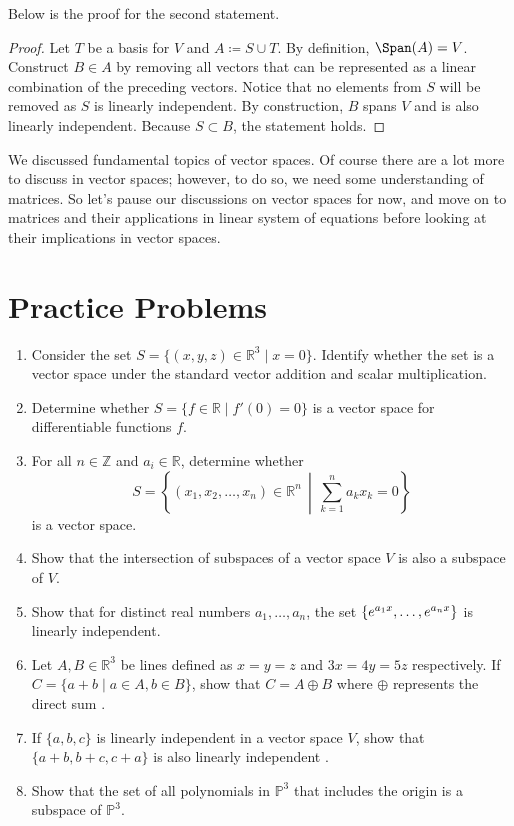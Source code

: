 \documentclass[../main.tex]{subfiles}
\begin{document}
Below is the proof for the second statement.

\begin{proof}
Let $T$ be a basis for $V$ and $A \coloneqq S \cup T$. By definition,
$\Span(A) = V$. Construct $B \in A$ by removing all vectors that can
be represented as a linear combination of the preceding vectors.
Notice that no elements from $S$ will be removed as $S$ is linearly
independent. By construction, $B$ spans $V$ and is also linearly
independent. Because $S \subset B$, the statement holds.
\end{proof}

We discussed fundamental topics of vector spaces. Of course there
are a lot more to discuss in vector spaces; however, to do so,
we need some understanding of matrices. So let's pause our discussions
on vector spaces for now, and move on to matrices and their
applications in linear system of equations before looking at their
implications in vector spaces.

\section{Practice Problems}
\begin{enumerate}
\item
Consider the set $S = \{ (x, y, z) \in \mathbb{R}^3 \mid x = 0 \}$.
Identify whether the set is a vector space under the standard vector
addition and scalar multiplication.

\item
Determine whether $S = \{ f \in \mathbb{R} \mid f'(0) = 0 \}$
is a vector space for differentiable functions $f$.

\item
For all $n \in \mathbb{Z}$ and $a_i \in \mathbb{R}$, determine whether
\[
S =
\left\{
    (x_1, x_2, \ldots, x_n) \in \mathbb{R}^n
    \,\middle\vert\,
    \sum_{k = 1}^n a_k x_k = 0
\right\}
\]
is a vector space.

\item
Show that the intersection of subspaces of a vector space $V$
is also a subspace of $V$.

\item
Show that for distinct real numbers $a_1, \ldots, a_n$, the set
$\{ e^{a_1 x}, \ldots, \linebreak e^{a_n x} \}$ is linearly
independent.

\item
Let $A, B \in \mathbb{R}^3$ be lines defined as $x = y = z$ and
$3x = 4y = 5z$ respectively. If $C = \{ a + b \mid a \in A, b \in B
\}$, show that $C = A \oplus B$ where $\oplus$ represents the direct
sum \cite{refbook1}.

\item
If $\{ a, b, c \}$ is linearly independent in a vector space $V$,
show that $\{ a+b, b+c, c+a \}$ is also linearly independent
\cite{refbook1}.

\item
Show that the set of all polynomials in $\mathbb{P}^3$ that includes
the origin is a subspace of $\mathbb{P}^3$.
\end{enumerate}
\end{document}
